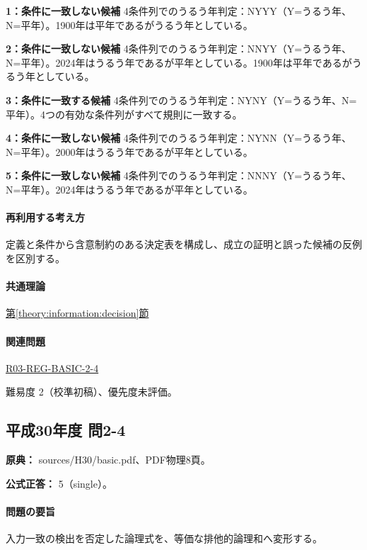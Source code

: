 \noindent\textbf{1：条件に一致しない候補} 4条件列でのうるう年判定：NYYY（Y=うるう年、N=平年）。1900年は平年であるがうるう年としている。\par

\noindent\textbf{2：条件に一致しない候補} 4条件列でのうるう年判定：NNYY（Y=うるう年、N=平年）。2024年はうるう年であるが平年としている。1900年は平年であるがうるう年としている。\par

\noindent\textbf{3：条件に一致する候補} 4条件列でのうるう年判定：NYNY（Y=うるう年、N=平年）。4つの有効な条件列がすべて規則に一致する。\par

\noindent\textbf{4：条件に一致しない候補} 4条件列でのうるう年判定：NYNN（Y=うるう年、N=平年）。2000年はうるう年であるが平年としている。\par

\noindent\textbf{5：条件に一致しない候補} 4条件列でのうるう年判定：NNNY（Y=うるう年、N=平年）。2024年はうるう年であるが平年としている。\par

\paragraph{再利用する考え方} 定義と条件から含意制約のある決定表を構成し、成立の証明と誤った候補の反例を区別する。

\paragraph{共通理論} \hyperref[theory:information:decision]{第\ref*{theory:information:decision}節}

\paragraph{関連問題} \hyperref[q:r03-reg-basic-2-4]{R03-REG-BASIC-2-4}

\par 難易度 2（校準初稿）、優先度未評価。

\subsection{平成30年度 問2-4}
\label{q:h30-reg-basic-2-4}

\noindent\textbf{原典：} sources/H30/basic.pdf、PDF物理8頁。

\textbf{公式正答：} 5（single）。

\paragraph{問題の要旨} 入力一致の検出を否定した論理式を、等価な排他的論理和へ変形する。

